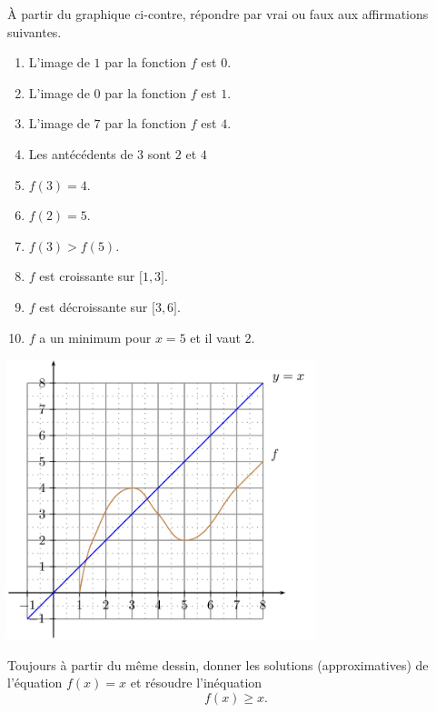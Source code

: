 
\begin{exercice}\label{exoSeconde-0069}

    \begin{multicols}{2}

À partir du graphique ci-contre, répondre par vrai ou faux aux affirmations suivantes.

\begin{enumerate}
    \item
       L'image de \( 1\) par la fonction \( f\) est \( 0\).
   \item
       L'image de \( 0\) par la fonction \( f\) est \( 1\).
   \item
       L'image de \( 7\) par la fonction \( f\) est \( 4\).
   \item
       Les antécédents de \( 3\) sont \( 2\) et \( 4\)
   \item
       \( f(3)=4\).
   \item
       \( f(2)=5\).
   \item
       \( f(3)>f(5)\).
   \item
       \( f\) est croissante sur \( \mathopen[ 1 , 3 \mathclose]\).
   \item
       \( f\) est décroissante sur \( \mathopen[ 3 , 6 \mathclose]\).
    \item
        \( f\) a un minimum pour \( x=5\) et il vaut \( 2\).

\end{enumerate}

\columnbreak


\includegraphics[width=9.0cm]{Picture_FIGLabelFigExoIntersectionCourbenzIxXdPICTExoIntersectionCourbenzIxXd-for_eps.png}

    \end{multicols}

Toujours à partir du même dessin, donner les solutions (approximatives) de l'équation \( f(x)=x\) et résoudre l'inéquation
\begin{equation}
    f(x)\geq x.
\end{equation}


\end{exercice}
